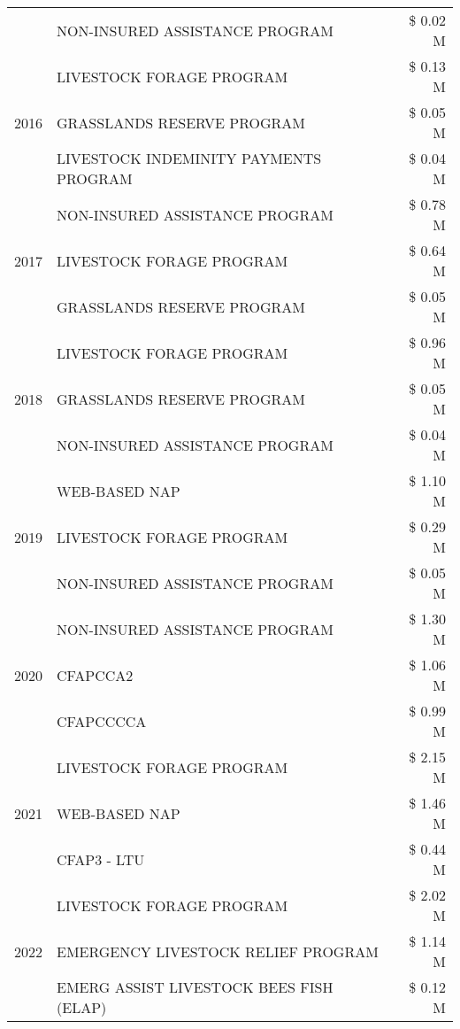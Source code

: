 \begin{tabular}{llr}
 & NON-INSURED ASSISTANCE PROGRAM & \$ 0.02 M \\
\cline{1-3}
\multirow[t]{3}{*}{2016} & LIVESTOCK FORAGE PROGRAM & \$ 0.13 M \\
 & GRASSLANDS RESERVE PROGRAM & \$ 0.05 M \\
 & LIVESTOCK INDEMINITY PAYMENTS PROGRAM & \$ 0.04 M \\
\cline{1-3}
\multirow[t]{3}{*}{2017} & NON-INSURED ASSISTANCE PROGRAM & \$ 0.78 M \\
 & LIVESTOCK FORAGE PROGRAM & \$ 0.64 M \\
 & GRASSLANDS RESERVE PROGRAM & \$ 0.05 M \\
\cline{1-3}
\multirow[t]{3}{*}{2018} & LIVESTOCK FORAGE PROGRAM & \$ 0.96 M \\
 & GRASSLANDS RESERVE PROGRAM & \$ 0.05 M \\
 & NON-INSURED ASSISTANCE PROGRAM & \$ 0.04 M \\
\cline{1-3}
\multirow[t]{3}{*}{2019} & WEB-BASED NAP & \$ 1.10 M \\
 & LIVESTOCK FORAGE PROGRAM & \$ 0.29 M \\
 & NON-INSURED ASSISTANCE PROGRAM & \$ 0.05 M \\
\cline{1-3}
\multirow[t]{3}{*}{2020} & NON-INSURED ASSISTANCE PROGRAM & \$ 1.30 M \\
 & CFAPCCA2 & \$ 1.06 M \\
 & CFAPCCCCA & \$ 0.99 M \\
\cline{1-3}
\multirow[t]{3}{*}{2021} & LIVESTOCK FORAGE PROGRAM & \$ 2.15 M \\
 & WEB-BASED NAP & \$ 1.46 M \\
 & CFAP3 - LTU & \$ 0.44 M \\
\cline{1-3}
\multirow[t]{3}{*}{2022} & LIVESTOCK FORAGE PROGRAM & \$ 2.02 M \\
 & EMERGENCY LIVESTOCK RELIEF PROGRAM & \$ 1.14 M \\
 & EMERG ASSIST LIVESTOCK BEES FISH (ELAP) & \$ 0.12 M \\
\cline{1-3}
\bottomrule
\end{tabular}

